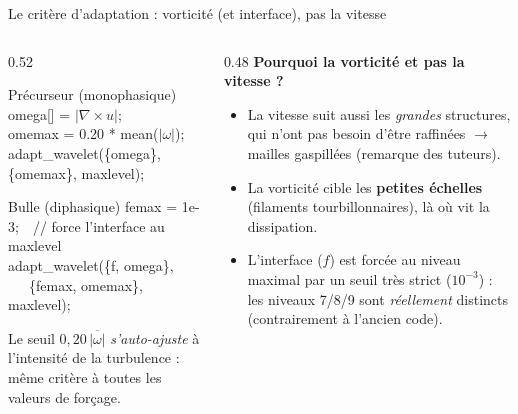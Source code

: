 \documentclass[11pt,aspectratio=169]{beamer}
\begin{document}
\begin{frame}{Le critère d'adaptation : vorticité (et interface), pas la vitesse}
  \begin{columns}[T]
    \begin{column}{0.52\textwidth}
      \begin{block}{Précurseur (monophasique)}
        \ttfamily\scriptsize
        omega[] = $|\nabla\times u|$;\\
        omemax = 0.20 * mean($|\omega|$);\\
        adapt\_wavelet(\{omega\}, \{omemax\}, maxlevel);
      \end{block}
      \begin{block}{Bulle (diphasique)}
        \ttfamily\scriptsize
        femax = 1e-3;~~// force l'interface au maxlevel\\
        adapt\_wavelet(\{f, omega\},\\
        ~~~\{femax, omemax\}, maxlevel);
      \end{block}
      \footnotesize
      Le seuil $0{,}20\,\overline{|\omega|}$ \emph{s'auto-ajuste} à
      l'intensité de la turbulence : même critère à toutes les valeurs
      de forçage.
    \end{column}
    \begin{column}{0.48\textwidth}
      \textbf{Pourquoi la vorticité et pas la vitesse ?}
      \begin{itemize}
        \item La vitesse suit aussi les \emph{grandes} structures, qui n'ont
              pas besoin d'être raffinées $\to$ mailles gaspillées
              (remarque des tuteurs).
        \item La vorticité cible les \textbf{petites échelles}
              (filaments tourbillonnaires), là où vit la dissipation.
        \item L'interface ($f$) est forcée au niveau maximal par un seuil
              très strict ($10^{-3}$) : les niveaux 7/8/9 sont
              \emph{réellement} distincts (contrairement à l'ancien code).
      \end{itemize}
    \end{column}
  \end{columns}
\end{frame}

\end{document}
